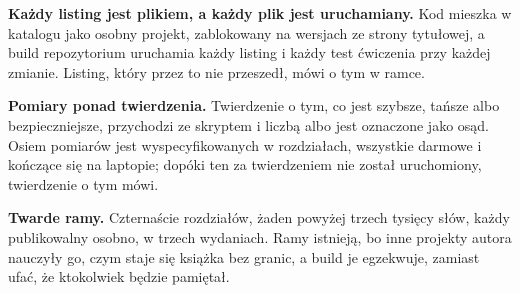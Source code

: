 \begin{note}
\textbf{Każdy listing jest plikiem, a każdy plik jest uruchamiany.} Kod
mieszka w katalogu  jako osobny projekt, zablokowany na wersjach
ze strony tytułowej, a build repozytorium uruchamia każdy listing i każdy test
ćwiczenia przy każdej zmianie. Listing, który przez to nie przeszedł, mówi o
tym w ramce.
\end{note}

\begin{note}
\textbf{Pomiary ponad twierdzenia.} Twierdzenie o tym, co jest szybsze,
tańsze albo bezpieczniejsze, przychodzi ze skryptem i liczbą albo jest
oznaczone jako osąd. Osiem pomiarów jest wyspecyfikowanych w rozdziałach,
wszystkie darmowe i kończące się na laptopie; dopóki ten za twierdzeniem nie
został uruchomiony, twierdzenie o tym mówi.
\end{note}

\begin{note}
\textbf{Twarde ramy.} Czternaście rozdziałów, żaden powyżej trzech tysięcy
słów, każdy publikowalny osobno, w trzech wydaniach. Ramy istnieją, bo inne
projekty autora nauczyły go, czym staje się książka bez granic, a build je
egzekwuje, zamiast ufać, że ktokolwiek będzie pamiętał.
\end{note}
